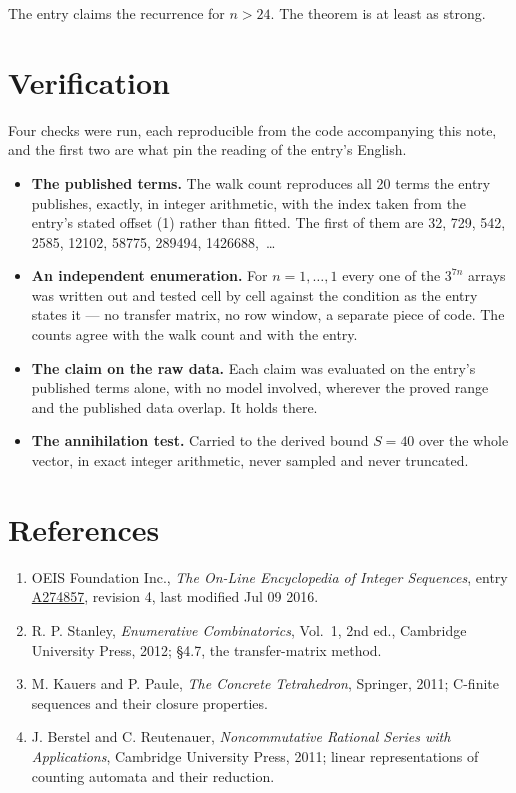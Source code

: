 \documentclass[11pt]{article}
\theoremstyle{definition}
\begin{document}
The entry claims the recurrence for $n > 24$. The theorem is at least as strong.

\section{Verification}

Four checks were run, each reproducible from the code accompanying this note, and the first two are what pin the reading of the entry's English.

\begin{itemize}

\item {\bfseries The published terms.} The walk count reproduces all 20 terms the entry publishes, exactly, in integer arithmetic, with the index taken from the entry's stated offset (1) rather than fitted. The first of them are 32, 729, 542, 2585, 12102, 58775, 289494, 1426688,~\dots

\item {\bfseries An independent enumeration.} For $n = 1,\dots,1$ every one of the $3^{7n}$ arrays was written out and tested cell by cell against the condition as the entry states it --- no transfer matrix, no row window, a separate piece of code. The counts agree with the walk count and with the entry.

\item {\bfseries The claim on the raw data.} Each claim was evaluated on the entry's published terms alone, with no model involved, wherever the proved range and the published data overlap. It holds there.

\item {\bfseries The annihilation test.} Carried to the derived bound $S = 40$ over the whole vector, in exact integer arithmetic, never sampled and never truncated.

\end{itemize}

\section{References}

\begin{enumerate}

\item OEIS Foundation Inc., \emph{The On-Line Encyclopedia of Integer Sequences}, entry \href{https://oeis.org/A274857}{A274857}, revision 4, last modified Jul 09 2016.

\item R. P. Stanley, \emph{Enumerative Combinatorics}, Vol.~1, 2nd ed., Cambridge University Press, 2012; \S4.7, the transfer-matrix method.

\item M. Kauers and P. Paule, \emph{The Concrete Tetrahedron}, Springer, 2011; C-finite sequences and their closure properties.

\item J. Berstel and C. Reutenauer, \emph{Noncommutative Rational Series with Applications}, Cambridge University Press, 2011; linear representations of counting automata and their reduction.

\end{enumerate}
\end{document}
